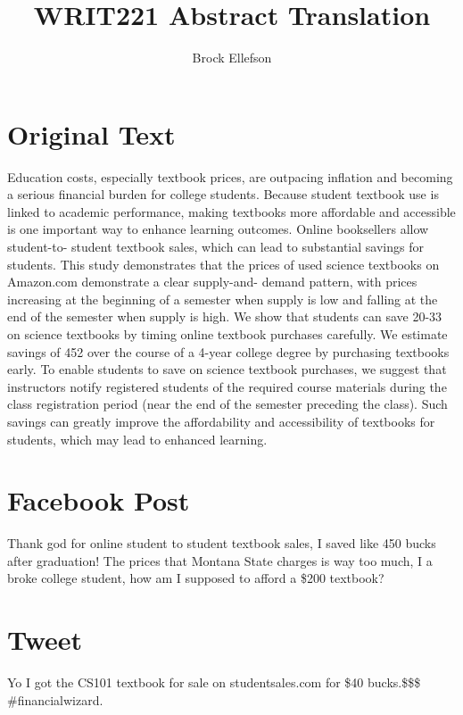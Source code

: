 \documentclass[10pt,letterpaper]{article}
\author{Brock Ellefson}
\title{WRIT221 Abstract Translation}
\begin{document}
\maketitle

\section*{Original Text}

Education costs, especially textbook prices, are outpacing inflation and becoming a serious financial
burden for college students. Because student textbook use is linked to academic performance,
making textbooks more affordable and accessible is one important way to enhance learning outcomes.
Online booksellers allow student-to- student textbook sales, which can lead to substantial savings for
students. This study demonstrates that the prices of used science textbooks on Amazon.com
demonstrate a clear supply-and- demand pattern, with prices increasing at the beginning of a semester
when supply is low and falling at the end of the semester when supply is high. We show that students
can save 20-33 on science textbooks by timing online textbook purchases carefully. We estimate
savings of 452 over the course of a 4-year college degree by purchasing textbooks early. To enable
students to save on science textbook purchases, we suggest that instructors notify registered students
of the required course materials during the class registration period (near the end of the semester
preceding the class). Such savings can greatly improve the affordability and accessibility
of textbooks for students, which may lead to enhanced learning.

\section*{Facebook Post}
Thank god for online student to student textbook sales, I saved like 450 bucks after graduation! The prices that Montana State charges is way too much, I a broke college student, how am I supposed to afford a \$200 textbook? 

\section*{Tweet}
Yo I got the CS101 textbook for sale on studentsales.com for \$40 bucks.\$\$\$ \#financialwizard. 
\end{document}

